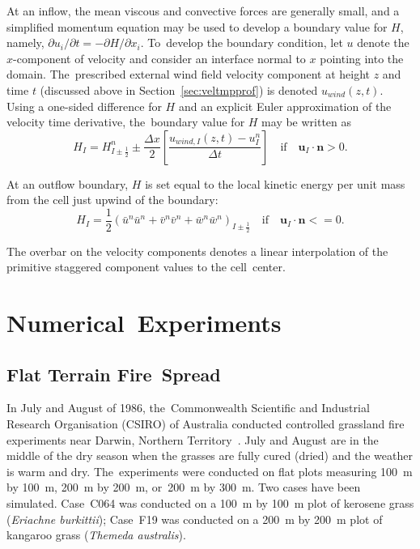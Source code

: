 \documentclass[atmosphere,article,accept,moreauthors,pdftex]{Definitions/mdpi}
\begin{document}
\begin{paracol}{2}
At an inflow, the mean viscous and convective forces are generally small, and a simplified momentum equation   may be used to develop a boundary value for $H$, namely, $\partial u_i/\partial t = -\partial H/\partial x_i$. To~develop the boundary condition, let $u$ denote the $x$-component of velocity and consider an interface normal to $x$ pointing into the domain.  The~prescribed external wind field velocity component at height $z$ and time $t$ (discussed above in \mbox{Section~\ref{sec:veltmpprof}}) is denoted $u_{wind}(z,t)$.  Using a one-sided difference for $H$ and an explicit Euler approximation of the velocity time derivative, the~boundary value for $H$ may be written as
\begin{equation}
\label{eq:Hin}
H_I = H_{I\pm\frac{1}{2}}^n \pm \frac{\Delta x}{2}\left[\frac{u_{wind,I}(z,t) - u_I^n}{\Delta t}\right] \quad \mbox{if} \quad \mathbf{u}_I\cdot\mathbf{n}>0.
\end{equation}

At an outflow boundary, $H$ is set equal to the local kinetic energy per unit mass from the cell just upwind of the boundary:
\begin{equation}
\label{eq:Hout}
H_I = \frac{1}{2}(\bar{u}^n \bar{u}^n + \bar{v}^n \bar{v}^n + \bar{w}^n \bar{w}^n)_{I\pm\frac{1}{2}} \quad \mbox{if} \quad \mathbf{u}_I\cdot\mathbf{n}<=0.
\end{equation}

The overbar on the velocity components denotes a linear interpolation of the primitive staggered component values to the cell~center.

\section{Numerical~Experiments} \label{sec:numexp}
\unskip


\subsection{Flat Terrain Fire~Spread}  \label{sec:simexp}

In July and August of 1986, the~Commonwealth Scientific and Industrial Research Organisation (CSIRO) of Australia conducted controlled grassland fire experiments near Darwin, Northern Territory~\cite{Cheney:IJWF1993}. July and August are in the middle of the dry season when the grasses are fully cured (dried) and the weather is warm and dry. The~experiments were conducted on flat plots measuring 100~m by 100~m, 200~m by 200~m, or~200~m by 300~m. Two cases have been simulated. Case~C064 was conducted on a 100~m by 100~m plot of kerosene grass ({\it Eriachne burkittii}); Case~F19 was conducted on a 200~m by 200~m plot of kangaroo grass ({\it Themeda australis}).


\end{paracol}
\end{document}
